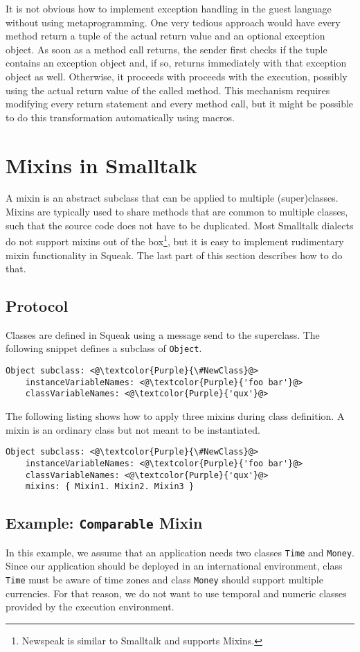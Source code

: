 \documentclass[12pt]{article}
\begin{document}
It is not obvious how to implement exception handling in the guest language without using metaprogramming. One very tedious approach would have every method return a tuple of the actual return value and an optional exception object. As soon as a method call returns, the sender first checks if the tuple contains an exception object and, if so, returns immediately with that exception object as well. Otherwise, it proceeds with proceeds with the execution, possibly using the actual return value of the called method. This mechanism requires modifying every return statement and every method call, but it might be possible to do this transformation automatically using macros.


\section{Mixins in Smalltalk}
A mixin is an abstract subclass that can be applied to multiple (super)classes. Mixins are typically used to share methods that are common to multiple classes, such that the source code does not have to be duplicated. Most Smalltalk dialects do not support mixins out of the box\footnote{Newspeak is similar to Smalltalk and supports Mixins.}, but it is easy to implement rudimentary mixin functionality in Squeak. The last part of this section describes how to do that.

\subsection{Protocol}
Classes are defined in Squeak using a message send to the superclass. The following snippet defines a subclass of \texttt{Object}.
\begin{lstlisting}
Object subclass: <@\textcolor{Purple}{\#NewClass}@>
    instanceVariableNames: <@\textcolor{Purple}{'foo bar'}@>
    classVariableNames: <@\textcolor{Purple}{'qux'}@>
\end{lstlisting}

The following listing shows how to apply three mixins during class definition. A mixin is an ordinary class but not meant to be instantiated.
\begin{lstlisting}
Object subclass: <@\textcolor{Purple}{\#NewClass}@>
    instanceVariableNames: <@\textcolor{Purple}{'foo bar'}@>
    classVariableNames: <@\textcolor{Purple}{'qux'}@>
    mixins: { Mixin1. Mixin2. Mixin3 }
\end{lstlisting}

\subsection{Example: \texttt{Comparable} Mixin}
In this example, we assume that an application needs two classes \texttt{Time} and \texttt{Money}. Since our application should be deployed in an international environment, class \texttt{Time} must be aware of time zones and class \texttt{Money} should support multiple currencies. For that reason, we do not want to use temporal and numeric classes provided by the execution environment.
\end{document}
